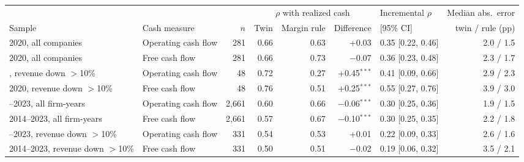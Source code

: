\begin{tabular}{llrrrrlr}
\toprule
 & & & \multicolumn{3}{c}{$\rho$ with realized cash} & Incremental $\rho$ & Median abs.\ error \\
\cmidrule(lr){4-6}
Sample & Cash measure & $n$ & Twin & Margin rule & Difference & [95\% CI] & twin / rule (pp) \\
\midrule
2020, all companies & Operating cash flow & 281 & 0.66 & 0.63 & +0.03 & 0.35 [0.22, 0.46] & 2.0 / 1.5 \\
2020, all companies & Free cash flow & 281 & 0.66 & 0.73 & $-$0.07 & 0.36 [0.23, 0.48] & 2.3 / 1.7 \\
\addlinespace
2020, revenue down $>$10\% & Operating cash flow & 48 & 0.72 & 0.27 & +0.45$^{***}$ & 0.41 [0.09, 0.66] & 2.9 / 2.3 \\
2020, revenue down $>$10\% & Free cash flow & 48 & 0.76 & 0.51 & +0.25$^{***}$ & 0.55 [0.27, 0.76] & 3.9 / 3.0 \\
\addlinespace
2014--2023, all firm-years & Operating cash flow & 2{,}661 & 0.60 & 0.66 & $-$0.06$^{***}$ & 0.30 [0.25, 0.36] & 1.9 / 1.5 \\
2014--2023, all firm-years & Free cash flow & 2{,}661 & 0.57 & 0.67 & $-$0.10$^{***}$ & 0.30 [0.25, 0.35] & 2.2 / 1.8 \\
\addlinespace
2014--2023, revenue down $>$10\% & Operating cash flow & 331 & 0.54 & 0.53 & +0.01 & 0.22 [0.09, 0.33] & 2.6 / 1.6 \\
2014--2023, revenue down $>$10\% & Free cash flow & 331 & 0.50 & 0.51 & $-$0.02 & 0.19 [0.06, 0.32] & 3.5 / 2.1 \\
\bottomrule
\end{tabular}
